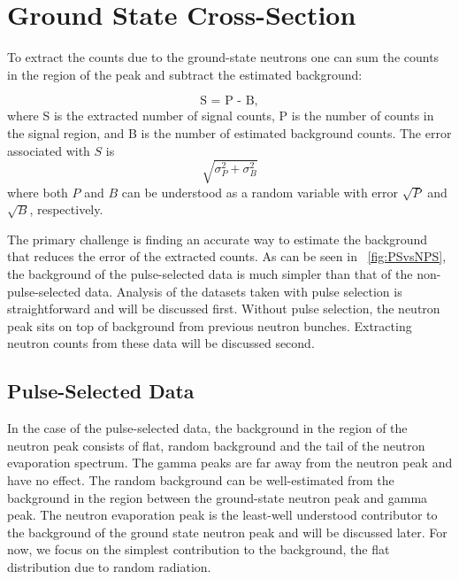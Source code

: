 \section{Ground State Cross-Section}

To extract the counts due to the ground-state neutrons one can sum the counts in the region of the peak and subtract the estimated background:

\begin{equation}
\text{S = P - B},
\label{eq:counts}
\end{equation}
where S is the extracted number of signal counts, P is the number of counts in the signal region, and B is the number of estimated background counts.  The error associated with $S$ is
\begin{equation}
\sqrt{\sigma_{P}^2 + \sigma_{B}^2}
\label{eq:errDef}
\end{equation}
where both $P$ and $B$ can be understood as a random variable with error $\sqrt{P}$ and $\sqrt{B}$, respectively.

The primary challenge is finding an accurate way to estimate the background that reduces the error of the extracted counts.  As can be seen in {\fig}~\ref{fig:PSvsNPS}, the background of the pulse-selected data is much simpler than that of the non-pulse-selected data.  Analysis of the datasets taken with pulse selection is straightforward and will be discussed first.  Without pulse selection, the neutron peak sits on top of background from previous neutron bunches.  Extracting neutron counts from these data will be discussed second.

\subsection{Pulse-Selected Data}
In the case of the pulse-selected data, the background in the region of the neutron peak consists of flat, random background and the tail of the neutron evaporation spectrum.  The gamma peaks are far away from the neutron peak and have no effect.  The random background can be well-estimated from the background in the region between the ground-state neutron peak and gamma peak.  The neutron evaporation peak is the least-well understood contributor to the background of the ground state neutron peak and will be discussed later.  For now, we focus on the simplest contribution to the background, the flat distribution due to random radiation.

